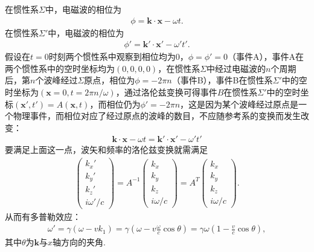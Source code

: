 \documentclass{assignment}
\begin{document}
在惯性系$\Sigma$中，电磁波的相位为
\begin{align}
    \phi=\bm{k}\cdot\bm{x}-\omega t.
\end{align}
在惯性系$\Sigma'$中，电磁波的相位为
\begin{align}
    \phi'=\bm{k}'\cdot\bm{x}'-\omega't'.
\end{align}
假设在$t=0$时刻两个惯性系中观察到相位均为$0$，$\phi=\phi'=0$（事件A），事件A在两个惯性系中的空时坐标均为$(0,0,0,0)$，在惯性系$\Sigma$中经过电磁波的$n$个周期后，第$n$个波峰经过$\Sigma$原点，相位为$\phi=-2\pi n$（事件B），事件B在惯性系$\Sigma'$中的空时坐标为$(\bm{x}=0,t=2\pi n/\omega)$，通过洛伦兹变换可得事件$B$在惯性系$\Sigma'$中的空时坐标$(\bm{x}',t')=A(\bm{x},t)$，而相位仍为$\phi'=-2\pi n$，这是因为某个波峰经过原点是一个物理事件，而相位对应了经过原点的波峰的数目，不应随参考系的变换而发生改变：
\begin{align}
    \bm{k}\cdot\bm{x}-\omega t=\bm{k}'\cdot\bm{x}'-\omega't'
\end{align}
要满足上面这一点，波矢和频率的洛伦兹变换就需满足
\begin{align}
    \left(\begin{matrix}
        k_x'\\
        k_y'\\
        k_z'\\
        i\omega'/c
    \end{matrix}\right)=A^{-1}\left(\begin{matrix}
        k_x\\
        k_y\\
        k_z\\
        i\omega/c
    \end{matrix}\right)=A^T\left(\begin{matrix}
        k_x\\
        k_y\\
        k_z\\
        i\omega/c
    \end{matrix}\right).
\end{align}
从而有多普勒效应：
\begin{align}
    \omega'=\gamma(\omega-vk_1)=\gamma\left(\omega-v\frac{\omega}{c}\cos\theta\right)=\gamma\omega\left(1-\frac{v}{c}\cos\theta\right),
\end{align}
其中$\theta$为$\bm{k}$与$x$轴方向的夹角.
\end{document}
